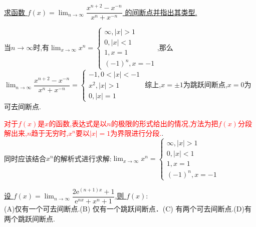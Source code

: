 \documentclass[8pt a4paper, oneside, UTF8]{ctexbook}
\begin{document}
\begin{sloppypar}
\begin{solution}
    \end{solution}
    \begin{problem}
        \uline{求函数 $f(x)=\lim_{n\to\infty}\dfrac{x^{n+2}-x^{-n}}{x^n+x^{-n}}$ 的间断点并指出其类型.}
    \end{problem}
    \begin{solution}
        当$n \to \infty$时,有$\lim_{x \to \infty}x^n=\begin{cases}
            \infty ,|x|>1\\ 
            0,|x|<1\\1,
            x=1\\
            (-1)^n,x=-1
        \end{cases}$,那么$\lim_{n\to\infty}\dfrac{x^{n+2}-x^{-n}}{x^n+x^{-n}}=
        \begin{cases} 
            -1,0<|x|<-1\\x^2,|x|>1\\0,|x|=1
        \end{cases}$
    综上,$x= \pm 1$为跳跃间断点,$x=0$为可去间断点.
    \end{solution}
    \begin{note}
        \textcolor{red}{对于$f(x)$是$x$的函数,表达式是以$n$的极限的形式给出的情况,方法为把$f(x)$分段解出来,$n$趋于无穷时,$x^n$要以$|x|=1$为界限进行分段.}.\\同时应该结合$x^n$的解析式进行求解:$\lim_{x \to \infty}x^n=\begin{cases}
            \infty ,|x|>1\\ 
            0,|x|<1\\1,
            x=1\\
            (-1)^n,x=-1
        \end{cases}$
    \end{note}
    \begin{problem}
        \uline{设 $f(x)=\lim_{n\to\infty}\dfrac{2\mathrm{e}^{(n+1)x}+1}{\mathrm{e}^{nx}+x^{n}+1}$,则 $f(x):$}  \\
        (A)仅有一个可去间断点.\quad(B) 仅有一个跳跃间断点．\quad(C) 有两个可去间断点.\quad(D)有两个跳跃间断点.
    \end{problem}
\end{sloppypar}
\end{document}

